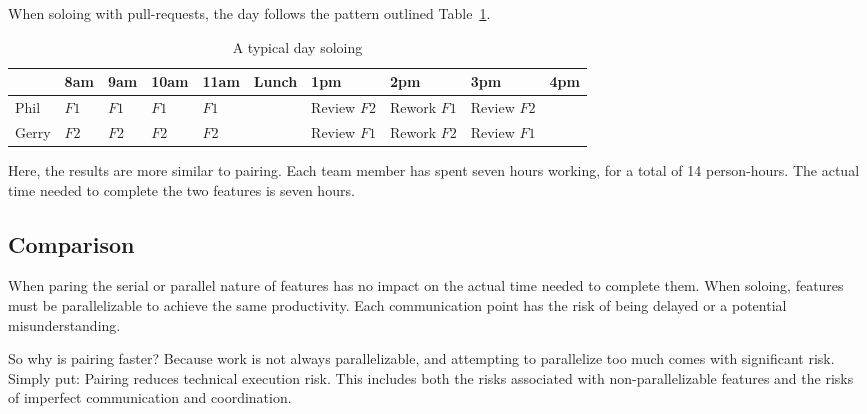 \documentclass[letterpaper]{article}
\theoremstyle{definition}
\begin{document}
    When soloing with pull-requests, the day follows the pattern outlined Table~\ref{tab:parallel-solo}.

    \begin{table}[h]
        \centering
        \tiny
        \begin{tabular}{ |l|l|l|l|l|l|l|l|l|l| }
            \hline
            & 8am                     & 9am                     & 10am                    & 11am                    & Lunch & 1pm                            & 2pm                            & 3pm                            & 4pm \\
            \hline
            Phil  & \cellcolor{blue!10}$F1$ & \cellcolor{blue!10}$F1$ & \cellcolor{blue!10}$F1$ & \cellcolor{blue!10}$F1$ &       & \cellcolor{red!10}Review $F2$ & \cellcolor{blue!10}Rework $F1$ & \cellcolor{red!10}Review $F2$ &     \\
            \hline
            Gerry & \cellcolor{red!10}$F2$  & \cellcolor{red!10}$F2$  & \cellcolor{red!10}$F2$  & \cellcolor{red!10}$F2$ &       & \cellcolor{blue!10}Review $F1$ & \cellcolor{red!10}Rework $F2$ & \cellcolor{blue!10}Review $F1$ &     \\
            \hline
        \end{tabular}
        \caption{A typical day soloing}
        \label{tab:parallel-solo}
    \end{table}

    Here, the results are more similar to pairing.
    Each team member has spent seven hours working, for a total of 14 person-hours.
    The actual time needed to complete the two features is seven hours.

    \subsection{Comparison}\label{subsec:comparison}

    When paring the serial or parallel nature of features has no impact on the actual time needed to
    complete them.
    When soloing, features must be parallelizable to achieve the same productivity.
    Each communication point has the risk of being delayed or a potential misunderstanding.

    So why is pairing faster?
    Because work is not always parallelizable, and attempting to parallelize too much comes with significant risk.
    Simply put: Pairing reduces technical execution risk.
    This includes both the risks associated with non-parallelizable features and the risks of imperfect communication
    and coordination.
\end{document}
